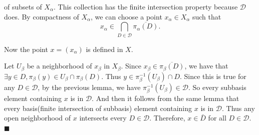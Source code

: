 \documentclass[main.tex]{subfiles}
\begin{document}
of subsets of $X_{\alpha}$. This collection has the finite intersection property because $\mathcal{D}$ does. By compactness of $X_{\alpha}$, we can choose a point $x_{\alpha} \in X_{\alpha}$ such that 
\begin{equation}
    x_{\alpha} \in \bigcap_{D \in \mathcal{D}} \overline{\pi_{\alpha}(D)}.
\end{equation}
\par Now the point $x = (x_{\alpha})$ is defined in $X$. 
\par Let $U_{\beta}$ be a neighborhood of $x_{\beta}$ in $X_{\beta}$. Since $x_{\beta} \in \overline{\pi_{\beta}(D)}$, we have that $\exists y\in D, \pi_{\beta}(y) \in U_{\beta} \cap \pi_{\beta}(D)$. Thus $y \in \pi_{\beta}^{-1}(U_{\beta}) \cap D$. Since this is true for any $D \in \mathcal{D}$, by the previous lemma, we have $\pi_{\beta}^{-1}(U_{\beta}) \in \mathcal{D}$. So every subbasis element containing $x$ is in $\mathcal{D}$. And then it follows from the same lemma that every basis(finite intersection of subbasis) element containing $x$ is in $\mathcal{D}$. Thus any open neighborhood of $x$ intersects every $D \in \mathcal{D}$. Therefore, $x \in \bar{D}$ for all $D \in \mathcal{D}$. 
\mbox{} \\ \null \hfill $\blacksquare$  
\end{document}
